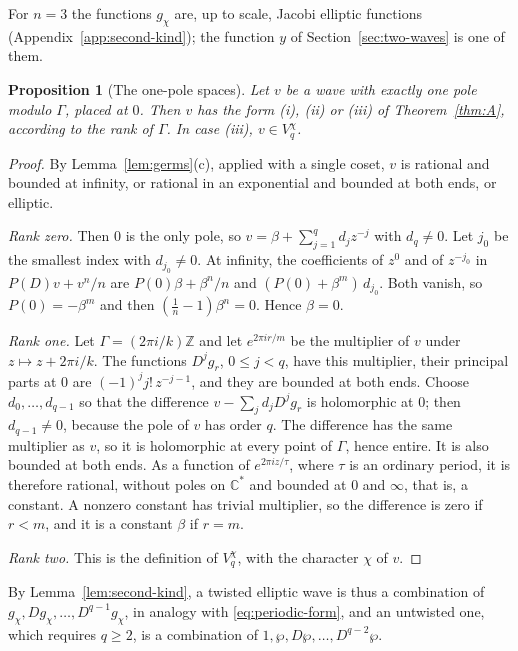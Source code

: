 \documentclass[11pt]{article}
\newtheorem{proposition}[theorem]{Proposition}
\theoremstyle{definition}
\theoremstyle{remark}
\numberwithin{equation}{section}
\newcommand{\CC}{\mathbb C}
\newcommand{\ZZ}{\mathbb Z}
\begin{document}
For \(n=3\) the functions \(g_\chi\) are, up to scale, Jacobi elliptic
functions (Appendix~\ref{app:second-kind}); the function \(y\) of
Section~\ref{sec:two-waves} is one of them.

\begin{proposition}[The one-pole spaces]\label{prop:spaces}
Let \(v\) be a wave with exactly one pole modulo \(\Gamma\), placed at
\(0\). Then \(v\) has the form \textup{(i)}, \textup{(ii)} or
\textup{(iii)} of Theorem~\ref{thm:A}, according to the rank of
\(\Gamma\). In case \textup{(iii)}, \(v\in V_q^\chi\).
\end{proposition}

\begin{proof}
By Lemma~\ref{lem:germs}(c), applied with a single coset, \(v\) is
rational and bounded at infinity, or rational in an exponential and
bounded at both ends, or elliptic.

\emph{Rank zero.} Then \(0\) is the only pole, so
\(v=\beta+\sum_{j=1}^{q}d_jz^{-j}\) with \(d_q\ne0\). Let \(j_0\) be
the smallest index with \(d_{j_0}\ne0\). At infinity, the coefficients
of \(z^0\) and of \(z^{-j_0}\) in \(P(D)v+v^n/n\) are
\(P(0)\beta+\beta^n/n\) and \((P(0)+\beta^m)\,d_{j_0}\). Both vanish, so
\(P(0)=-\beta^m\) and then \((\tfrac1n-1)\beta^n=0\). Hence
\(\beta=0\).

\emph{Rank one.} Let \(\Gamma=(2\pi i/k)\ZZ\) and let
\(e^{2\pi ir/m}\) be the multiplier of \(v\) under \(z\mapsto z+2\pi
i/k\). The functions \(D^jg_r\), \(0\le j<q\), have this multiplier,
their principal parts at \(0\) are \((-1)^jj!\,z^{-j-1}\), and they are
bounded at both ends. Choose \(d_0,\dots,d_{q-1}\) so that the
difference \(v-\sum_jd_jD^jg_r\) is holomorphic at \(0\); then
\(d_{q-1}\ne0\), because the pole of \(v\) has order \(q\). The
difference has the same multiplier as \(v\), so it is holomorphic at
every point of \(\Gamma\), hence entire. It is also bounded at both
ends. As a function of \(e^{2\pi iz/\tau}\), where \(\tau\) is an
ordinary period, it is therefore rational, without poles on \(\CC^*\)
and bounded at \(0\) and \(\infty\), that is, a constant. A nonzero
constant has trivial multiplier, so the difference is zero if \(r<m\),
and it is a constant \(\beta\) if \(r=m\).

\emph{Rank two.} This is the definition of \(V_q^\chi\), with the
character \(\chi\) of \(v\).
\end{proof}

By Lemma~\ref{lem:second-kind}, a twisted elliptic wave is thus a
combination of \(g_\chi,Dg_\chi,\dots,D^{q-1}g_\chi\), in analogy with
\eqref{eq:periodic-form}, and an untwisted one, which requires
\(q\ge2\), is a combination of \(1,\wp,D\wp,\dots,D^{q-2}\wp\).
\end{document}
